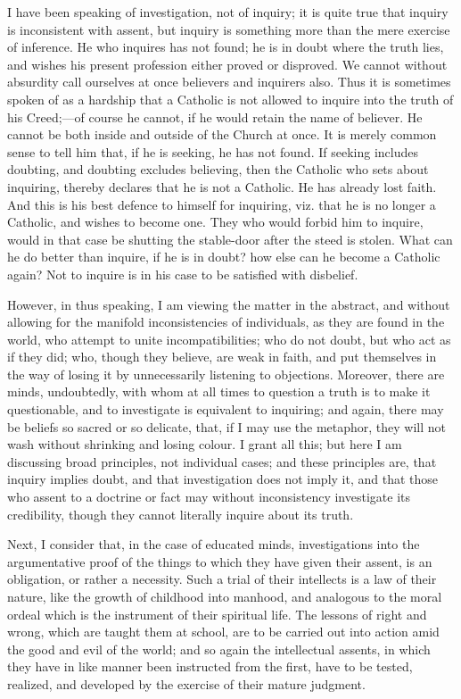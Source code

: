I have been speaking of investigation, not of inquiry; it is quite
true that inquiry is inconsistent with assent, but inquiry is
something more than the mere exercise of inference. He who inquires
has not found; he is in doubt where the truth lies, and wishes his
present profession either proved or disproved. We cannot without
absurdity call ourselves at once believers and inquirers also. Thus it
is sometimes spoken of as a hardship that a Catholic is not allowed to
inquire into the truth of his Creed;—of course he cannot, if he
would retain the name of believer. He cannot be both inside and
outside of the Church at once. It is merely common sense to tell him
that, if he is seeking, he has not found. If seeking includes
doubting, and doubting excludes believing, then the Catholic who sets
about inquiring, thereby declares that he is not a Catholic. He has
already lost faith. And this is his best defence to himself for
inquiring, viz. that he is no longer a Catholic, and wishes to become
one. They who would forbid him to inquire, would in that case be
shutting the stable-door after the steed is stolen. What can he do
better than inquire, if he is in doubt? how else can he become a
Catholic again? Not to inquire is in his case to be satisfied with
disbelief.

However, in thus speaking, I am viewing the matter in the abstract,
and without allowing for the manifold inconsistencies of individuals,
as they are found in the world, who attempt to unite
incompatibilities; who do not doubt, but who act as if they did;
who, though they believe, are weak in faith, and put themselves in the
way of losing it by unnecessarily listening to objections. Moreover,
there are minds, undoubtedly, with whom at all times to question a
truth is to make it questionable, and to investigate is equivalent to
inquiring; and again, there may be beliefs so sacred or so delicate,
that, if I may use the metaphor, they will not wash without shrinking
and losing colour. I grant all this; but here I am discussing broad
principles, not individual cases; and these principles are, that
inquiry implies doubt, and that investigation does not imply it, and
that those who assent to a doctrine or fact may without inconsistency
investigate its credibility, though they cannot literally inquire
about its truth.

Next, I consider that, in the case of educated minds,
investigations into the argumentative proof of the things to which
they have given their assent, is an obligation, or rather a necessity.
Such a trial of their intellects is a law of their nature, like the
growth of childhood into manhood, and analogous to the moral ordeal
which is the instrument of their spiritual life. The lessons of right
and wrong, which are taught them at school, are to be carried out into
action amid the good and evil of the world; and so again the
intellectual assents, in which they have in like manner been
instructed from the first, have to be tested, realized, and developed
by the exercise of their mature judgment.

